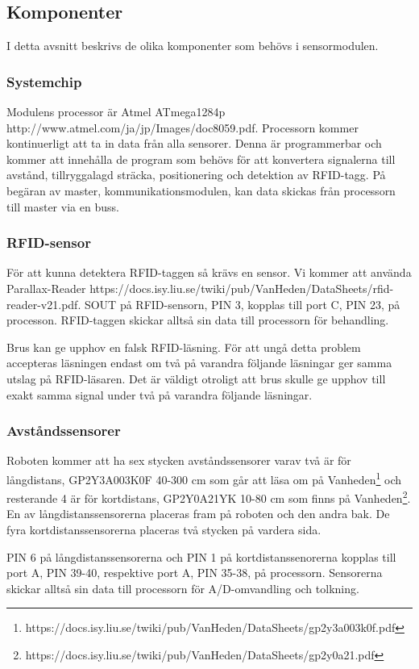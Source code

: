 \documentclass[a4paper,12pt,fleqn]{article}
\begin{document}
\subsection{Komponenter}
I detta avsnitt beskrivs de olika komponenter som behövs i sensormodulen.

\subsubsection{Systemchip}
Modulens processor är Atmel ATmega1284p http://www.atmel.com/ja/jp/Images/doc8059.pdf. Processorn kommer kontinuerligt att ta in data från alla sensorer. Denna är programmerbar och kommer att innehålla de program som behövs för att konvertera signalerna till avstånd, tillryggalagd sträcka, positionering och detektion av RFID-tagg. På begäran av master, kommunikationsmodulen, kan data skickas från processorn till master via en buss.

\subsubsection{RFID-sensor}
För att kunna detektera RFID-taggen så krävs en sensor. Vi kommer att använda Parallax-Reader https://docs.isy.liu.se/twiki/pub/VanHeden/DataSheets/rfid-reader-v21.pdf. 
SOUT på RFID-sensorn, PIN 3, kopplas till port C, PIN 23, på processon. RFID-taggen skickar alltså sin data till processorn för behandling.

Brus kan ge upphov en falsk RFID-läsning. För att ungå detta problem accepteras läsningen endast om två på varandra följande läsningar ger samma utslag på RFID-läsaren. Det är väldigt otroligt att brus skulle ge upphov till exakt samma signal under två på varandra följande läsningar.

\subsubsection{Avståndssensorer}
Roboten kommer att ha sex stycken avståndssensorer varav två är för långdistans, GP2Y3A003K0F 40-300 cm som går att läsa om på Vanheden\footnote{https://docs.isy.liu.se/twiki/pub/VanHeden/DataSheets/gp2y3a003k0f.pdf}  och resterande 4 är för kortdistans, GP2Y0A21YK 10-80 cm som finns på Vanheden\footnote{https://docs.isy.liu.se/twiki/pub/VanHeden/DataSheets/gp2y0a21.pdf}. En av långdistanssensorerna placeras fram på roboten och den andra bak. De fyra kortdistanssensorerna placeras två stycken på vardera sida.

PIN 6 på långdistanssensorerna och PIN 1 på kortdistanssenorerna kopplas till port A, PIN 39-40, respektive port A, PIN 35-38, på processorn. Sensorerna skickar alltså sin data till processorn för A/D-omvandling och tolkning.
\end{document}
